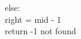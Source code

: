 \documentclass[preview]{standalone}
\begin{document}
else:\\right = mid - 1\\return -1   not found\\
\end{document}
